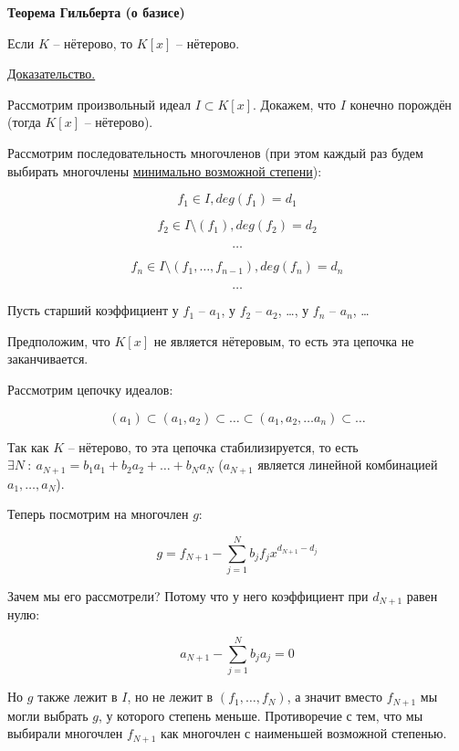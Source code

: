 \textbf{Теорема Гильберта (о базисе)}

Если $K$ -- нётерово, то $K[x]$ -- нётерово.

\underline{Доказательство.}

Рассмотрим произвольный идеал $I \subset K[x]$. Докажем, что
$I$ конечно порождён (тогда $K[x]$ -- нётерово).

Рассмотрим последовательность многочленов 
(при этом каждый раз будем выбирать многочлены 
\underline{минимально возможной степени}):

$$
f_1 \in I, deg(f_1) = d_1
$$

$$
f_2 \in I \setminus (f_1), deg(f_2) = d_2
$$

$$
\dots
$$

$$
f_n \in I \setminus (f_1, \dots, f_{n - 1}), deg(f_n) = d_n
$$

$$
\dots
$$

Пусть старший коэффициент у $f_1$ -- $a_1$, у $f_2$ -- $a_2$, \dots,
у $f_n$ -- $a_n$, \dots

Предположим, что $K[x]$ не является нётеровым, то есть эта цепочка не
заканчивается.

Рассмотрим цепочку идеалов:

\[
(a_1) \subset (a_1, a_2) \subset \dots \subset
(a_1, a_2, \dots a_n) \subset \dots
\]

Так как $K$ -- нётерово, то эта цепочка стабилизируется, то есть
$\exists N\ :\ a_{N + 1} = b_1 a_1 + b_2 a_2 + \dots + b_N a_N$
($a_{N + 1}$ является линейной комбинацией $a_1, \dots, a_N$).

Теперь посмотрим на многочлен $g$:

$$
g = f_{N + 1} - \sum_{j = 1}^N b_j f_j x^{d_{N + 1} - d_j}
$$

Зачем мы его рассмотрели? Потому что у него коэффициент при $d_{N + 1}$
равен нулю:

$$
a_{N + 1} - \sum_{j = 1}^N b_j a_j = 0
$$

Но $g$ также лежит в $I$, но не лежит в $(f_1, \dots, f_N)$, а значит 
вместо $f_{N + 1}$ мы могли выбрать $g$, у которого степень меньше.
Противоречие с тем, что мы выбирали многочлен $f_{N + 1}$ как
многочлен с наименьшей возможной степенью.
